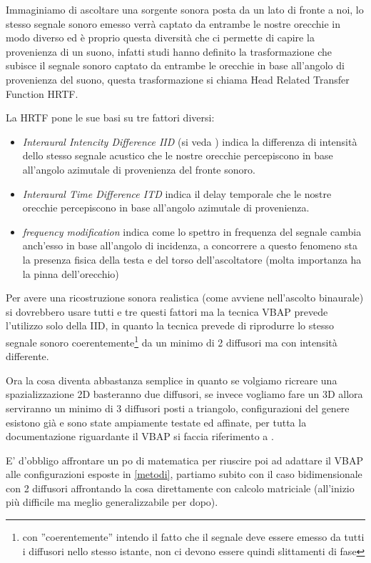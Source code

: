 \documentclass[12pt,a4paper]{report}
\begin{document}
Immaginiamo di ascoltare una sorgente sonora posta da un lato di fronte a noi, lo stesso segnale sonoro emesso verrà captato da entrambe le nostre orecchie in modo diverso ed è proprio questa diversità che ci permette di capire la provenienza di un suono, infatti studi hanno definito la trasformazione che subisce il segnale sonoro captato da entrambe le orecchie in base all'angolo di provenienza del suono, questa trasformazione si chiama Head Related Transfer Function HRTF.

La HRTF pone le sue basi su tre fattori diversi:

\begin{itemize}
\item \textit{Interaural Intencity Difference IID} (si veda \cite{iid}) indica la differenza di intensità dello stesso segnale acustico che le nostre orecchie percepiscono in base all'angolo azimutale di provenienza del fronte sonoro.
\item \textit{Interaural Time  Difference ITD} indica il delay temporale che le nostre orecchie percepiscono in base all'angolo azimutale di provenienza.
\item \textit{frequency modification} indica come lo spettro in frequenza del segnale cambia anch'esso in base all'angolo di incidenza, a concorrere a questo fenomeno sta la presenza fisica della testa e del torso dell'ascoltatore (molta importanza ha la pinna dell'orecchio)
\end{itemize}

Per avere una ricostruzione sonora realistica (come avviene nell'ascolto binaurale) si dovrebbero usare tutti e tre questi fattori ma la tecnica VBAP prevede l'utilizzo solo della IID, in quanto la tecnica prevede di riprodurre lo stesso segnale sonoro coerentemente\footnote{con ''coerentemente'' intendo il fatto che il segnale deve essere emesso da tutti i diffusori nello stesso istante, non ci devono essere quindi slittamenti di fase} da un minimo di 2 diffusori ma con intensità differente.

Ora la cosa diventa abbastanza semplice in quanto se volgiamo ricreare una spazializzazione 2D basteranno due diffusori, se invece vogliamo fare un 3D allora serviranno un minimo di 3 diffusori posti a triangolo, configurazioni del genere esistono già e sono state ampiamente testate ed affinate, per tutta la documentazione riguardante il VBAP si faccia riferimento a \cite{vbap}.

E' d'obbligo affrontare un po di matematica per riuscire poi ad adattare il VBAP alle configurazioni esposte in \ref{metodi}, partiamo subito con il caso bidimensionale con 2 diffusori affrontando la cosa direttamente con calcolo matriciale (all'inizio più difficile ma meglio generalizzabile per dopo).
\end{document}

